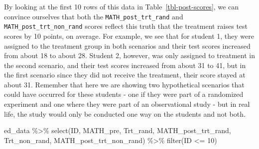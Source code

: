 \documentclass[
  letterpaper,
  DIV=11,
  numbers=noendperiod]{scrreprt}
\newenvironment{Shaded}{\begin{snugshade}}{\end{snugshade}}
\newcommand{\DecValTok}[1]{\textcolor[rgb]{0.68,0.00,0.00}{#1}}
\newcommand{\FunctionTok}[1]{\textcolor[rgb]{0.28,0.35,0.67}{#1}}
\newcommand{\NormalTok}[1]{\textcolor[rgb]{0.00,0.23,0.31}{#1}}
\newcommand{\SpecialCharTok}[1]{\textcolor[rgb]{0.37,0.37,0.37}{#1}}
\theoremstyle{definition}
\theoremstyle{remark}
\begin{document}
By looking at the first 10 rows of this data in
Table~\ref{tbl-post-scores}, we can convince ourselves that both the
\texttt{MATH\_post\_trt\_rand} and \texttt{MATH\_post\_trt\_non\_rand}
scores reflect this truth that the treatment raises test scores by 10
points, on average. For example, we see that for student 1, they were
assigned to the treatment group in both scenarios and their test scores
increased from about 18 to about 28. Student 2, however, was only
assigned to treatment in the second scenario, and their test scores
increased from about 31 to 41, but in the first scenario since they did
not receive the treatment, their score stayed at about 31. Remember that
here we are showing two hypothetical scenarios that could have occurred
for these students - one if they were part of a randomized experiment
and one where they were part of an observational study - but in real
life, the study would only be conducted one way on the students and not
both.

\begin{Shaded}
\begin{Highlighting}[]
\NormalTok{ed\_data }\SpecialCharTok{\%\textgreater{}\%} 
  \FunctionTok{select}\NormalTok{(ID, MATH\_pre, Trt\_rand, }
\NormalTok{         MATH\_post\_trt\_rand, Trt\_non\_rand, }
\NormalTok{         MATH\_post\_trt\_non\_rand) }\SpecialCharTok{\%\textgreater{}\%} 
  \FunctionTok{filter}\NormalTok{(ID }\SpecialCharTok{\textless{}=} \DecValTok{10}\NormalTok{)}
\end{Highlighting}
\end{Shaded}
\end{document}
